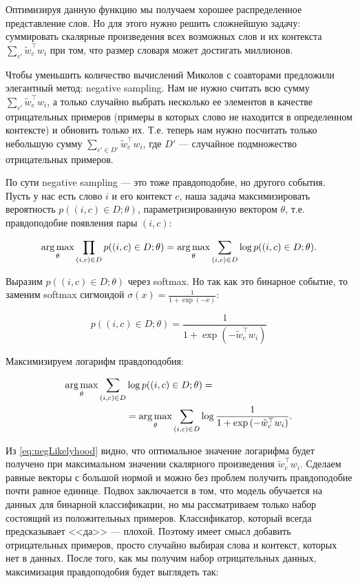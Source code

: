 Оптимизируя данную функцию мы получаем хорошее распределенное представление слов. Но для этого нужно решить
сложнейшую задачу: суммировать скалярные произведения всех возможных слов и их контекста $\sum_{c'}
\tilde{w}_c^\top w_i$ при том, что размер словаря может достигать миллионов.

\bigskip
Чтобы уменьшить количество вычислений Миколов с соавторами \cite{Mikolov:2} предложили элегантный метод:
negative sampling. Нам не нужно считать всю сумму $\sum_{c'} \tilde{w}_c^\top w_i$, а только случайно выбрать
несколько ее элементов в качестве отрицательных примеров (примеры в которых слово не находится в определенном
контексте) и обновить только их. Т.е. теперь нам нужно посчитать только небольшую сумму $\sum_{c' \in D'}
\tilde{w}_c^\top w_i$, где $D'$ --- случайное подмножество отрицательных примеров.

\bigskip
По сути negative sampling --- это тоже правдоподобие, но другого события. Пусть у нас есть слово $i$ и его
контекст $c$, наша задача максимизировать вероятность $p((i,c) \in D; \theta)$, параметризированную вектором
$\theta$, т.е. правдоподобие появления пары $(i,c)$:

\begin{equation}
 \operatorname*{arg\,max}_{\theta} \prod_{(i,c)\in D} p((i,c)\in D;\theta) = \operatorname*{arg\,max}_{\theta} \sum_{(i,c)\in D} \log{
p((i,c)\in D;\theta)}.
\end{equation}

Выразим $p((i,c)\in D;\theta)$ через softmax. Но так как это бинарное событие, то заменим softmax сигмоидой
$\sigma (x) = \frac{1}{1+\exp{(-x)}}$:

\begin{equation}
 p((i,c)\in D;\theta) = \frac{1}{1+\exp{(-\tilde{w}_c^{\top} w_i)}}
\end{equation}

Максимизируем логарифм правдоподобия:

\begin{equation} \label{eq:negLikelyhood}
\begin{aligned}
 \operatorname*{arg\,max}_{\theta} \sum_{(i,c)\in D} & \log{p((i,c)\in D;\theta)} = \\
 & = \operatorname*{arg\,max}_{\theta} \sum_{(i,c)\in D} \log{\frac{1}{1+\exp{(-\tilde{w}_c^{\top} w_i)}}}.
\end{aligned}
\end{equation}

Из \ref{eq:negLikelyhood} видно, что оптимальное значение логарифма будет получено при максимальном значении
скалярного произведения $\tilde{w}_c^{\top} w_i$. Сделаем равные векторы с большой нормой и можно без проблем
получить правдоподобие почти равное единице. Подвох заключается в том, что модель обучается на данных для
бинарной классификации, но мы рассматриваем только набор состоящий из положительных примеров. Классификатор,
который всегда предсказывает <<да>> --- плохой. Поэтому имеет смысл добавить отрицательных примеров, просто
случайно выбирая слова и контекст, которых нет в данных. После того, как мы получим набор отрицательных
данных, максимизация правдоподобия будет выглядеть так:

